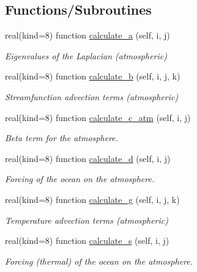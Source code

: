 \subsection*{Functions/\+Subroutines}
\begin{DoxyCompactItemize}
\item 
real(kind=8) function \hyperlink{namespaceinprod__analytic_a64153fea3801b0768d3b5122da23b324}{calculate\+\_\+a} (self, i, j)
\begin{DoxyCompactList}\small\item\em Eigenvalues of the Laplacian (atmospheric) \end{DoxyCompactList}\item 
real(kind=8) function \hyperlink{namespaceinprod__analytic_a5608ef2b86882c7055455fbd785a8f84}{calculate\+\_\+b} (self, i, j, k)
\begin{DoxyCompactList}\small\item\em Streamfunction advection terms (atmospheric) \end{DoxyCompactList}\item 
real(kind=8) function \hyperlink{namespaceinprod__analytic_aa0b310b730d6df3d09a565a09aa62a22}{calculate\+\_\+c\+\_\+atm} (self, i, j)
\begin{DoxyCompactList}\small\item\em Beta term for the atmosphere. \end{DoxyCompactList}\item 
real(kind=8) function \hyperlink{namespaceinprod__analytic_ab270711bbfe233c1182dca363f80ec41}{calculate\+\_\+d} (self, i, j)
\begin{DoxyCompactList}\small\item\em Forcing of the ocean on the atmosphere. \end{DoxyCompactList}\item 
real(kind=8) function \hyperlink{namespaceinprod__analytic_ae90415e2fe9f94483e4b353afc11d245}{calculate\+\_\+g} (self, i, j, k)
\begin{DoxyCompactList}\small\item\em Temperature advection terms (atmospheric) \end{DoxyCompactList}\item 
real(kind=8) function \hyperlink{namespaceinprod__analytic_a3ca3072c7041b05f960b841dbcc51979}{calculate\+\_\+s} (self, i, j)
\begin{DoxyCompactList}\small\item\em Forcing (thermal) of the ocean on the atmosphere. \end{DoxyCompactList}\item 

\end{DoxyCompactItemize}
